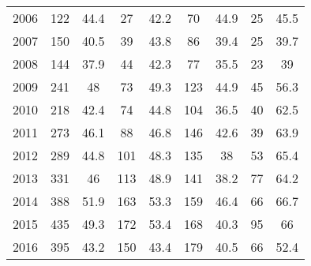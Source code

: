 \begin{table}[htbp]
\begin{tabular}{l*{8}{c}}
2006      &      122&     44.4&       27&     42.2&       70&     44.9&       25&     45.5\\
2007      &      150&     40.5&       39&     43.8&       86&     39.4&       25&     39.7\\
2008      &      144&     37.9&       44&     42.3&       77&     35.5&       23&       39\\
2009      &      241&       48&       73&     49.3&      123&     44.9&       45&     56.3\\
2010      &      218&     42.4&       74&     44.8&      104&     36.5&       40&     62.5\\
2011      &      273&     46.1&       88&     46.8&      146&     42.6&       39&     63.9\\
2012      &      289&     44.8&      101&     48.3&      135&       38&       53&     65.4\\
2013      &      331&       46&      113&     48.9&      141&     38.2&       77&     64.2\\
2014      &      388&     51.9&      163&     53.3&      159&     46.4&       66&     66.7\\
2015      &      435&     49.3&      172&     53.4&      168&     40.3&       95&       66\\
2016      &      395&     43.2&      150&     43.4&      179&     40.5&       66&     52.4\\
\hline\hline
\end{tabular}
\end{table}
